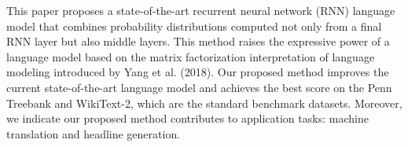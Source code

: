 This paper proposes a state-of-the-art recurrent neural network (RNN) language model that combines probability distributions computed not only from a final RNN layer but also middle layers. This method raises the expressive power of a language model based on the matrix factorization interpretation of language modeling introduced by Yang et al. (2018). Our proposed method improves the current state-of-the-art language model and achieves the best score on the Penn Treebank and WikiText-2, which are the standard benchmark datasets. Moreover, we indicate our proposed method contributes to application tasks: machine translation and headline generation.
